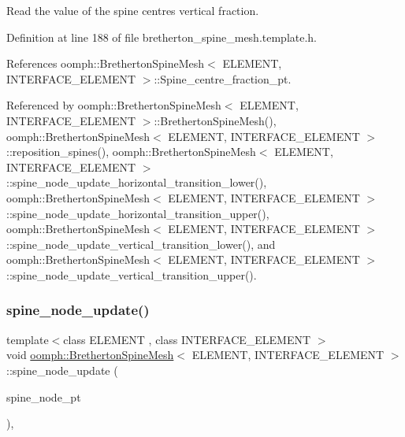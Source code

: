 Read the value of the spine centre\textquotesingle{}s vertical fraction. 



Definition at line 188 of file bretherton\+\_\+spine\+\_\+mesh.\+template.\+h.



References oomph\+::\+Bretherton\+Spine\+Mesh$<$ E\+L\+E\+M\+E\+N\+T, I\+N\+T\+E\+R\+F\+A\+C\+E\+\_\+\+E\+L\+E\+M\+E\+N\+T $>$\+::\+Spine\+\_\+centre\+\_\+fraction\+\_\+pt.



Referenced by oomph\+::\+Bretherton\+Spine\+Mesh$<$ E\+L\+E\+M\+E\+N\+T, I\+N\+T\+E\+R\+F\+A\+C\+E\+\_\+\+E\+L\+E\+M\+E\+N\+T $>$\+::\+Bretherton\+Spine\+Mesh(), oomph\+::\+Bretherton\+Spine\+Mesh$<$ E\+L\+E\+M\+E\+N\+T, I\+N\+T\+E\+R\+F\+A\+C\+E\+\_\+\+E\+L\+E\+M\+E\+N\+T $>$\+::reposition\+\_\+spines(), oomph\+::\+Bretherton\+Spine\+Mesh$<$ E\+L\+E\+M\+E\+N\+T, I\+N\+T\+E\+R\+F\+A\+C\+E\+\_\+\+E\+L\+E\+M\+E\+N\+T $>$\+::spine\+\_\+node\+\_\+update\+\_\+horizontal\+\_\+transition\+\_\+lower(), oomph\+::\+Bretherton\+Spine\+Mesh$<$ E\+L\+E\+M\+E\+N\+T, I\+N\+T\+E\+R\+F\+A\+C\+E\+\_\+\+E\+L\+E\+M\+E\+N\+T $>$\+::spine\+\_\+node\+\_\+update\+\_\+horizontal\+\_\+transition\+\_\+upper(), oomph\+::\+Bretherton\+Spine\+Mesh$<$ E\+L\+E\+M\+E\+N\+T, I\+N\+T\+E\+R\+F\+A\+C\+E\+\_\+\+E\+L\+E\+M\+E\+N\+T $>$\+::spine\+\_\+node\+\_\+update\+\_\+vertical\+\_\+transition\+\_\+lower(), and oomph\+::\+Bretherton\+Spine\+Mesh$<$ E\+L\+E\+M\+E\+N\+T, I\+N\+T\+E\+R\+F\+A\+C\+E\+\_\+\+E\+L\+E\+M\+E\+N\+T $>$\+::spine\+\_\+node\+\_\+update\+\_\+vertical\+\_\+transition\+\_\+upper().

\mbox{\label{classoomph_1_1BrethertonSpineMesh_a981301706d4940cfb24d3d769a7a523b}} 
\subsubsection{\texorpdfstring{spine\+\_\+node\+\_\+update()}{spine\_node\_update()}}
{\footnotesize\ttfamily template$<$class E\+L\+E\+M\+E\+NT , class I\+N\+T\+E\+R\+F\+A\+C\+E\+\_\+\+E\+L\+E\+M\+E\+NT $>$ \\
void \hyperlink{classoomph_1_1BrethertonSpineMesh}{oomph\+::\+Bretherton\+Spine\+Mesh}$<$ E\+L\+E\+M\+E\+NT, I\+N\+T\+E\+R\+F\+A\+C\+E\+\_\+\+E\+L\+E\+M\+E\+NT $>$\+::spine\+\_\+node\+\_\+update (\begin{DoxyParamCaption}\item[{Spine\+Node $\ast$}]{spine\+\_\+node\+\_\+pt }\end{DoxyParamCaption})\hspace{0.3cm}{\ttfamily [inline]}, {\ttfamily [virtual]}}



